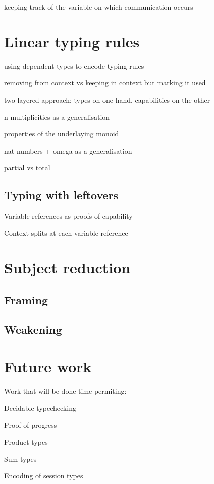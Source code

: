 \documentclass{scrartcl}
\begin{document}
keeping track of the variable on which communication occurs

\section{Linear typing rules}

using dependent types to encode typing rules

removing from context vs keeping in context but marking it used

two-layered approach: types on one hand, capabilities on the other

n multiplicities as a generalisation

properties of the underlaying monoid

nat numbers + omega as a generalisation

partial vs total

\subsection{Typing with leftovers}

Variable references as proofs of capability

Context splits at each variable reference

\section{Subject reduction}

\subsection{Framing}
\subsection{Weakening}

\section{Future work}

Work that will be done time permiting:

Decidable typechecking

Proof of progress

Product types

Sum types

Encoding of session types


\footnotesize


\end{document}
